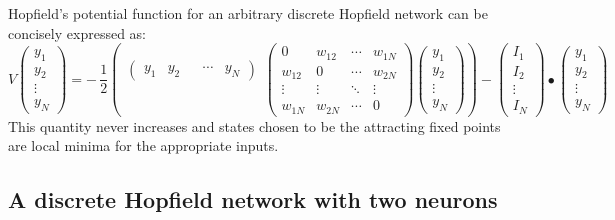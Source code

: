   Hopfield's potential function for an arbitrary discrete Hopfield network 
can be concisely expressed as:
\begin{equation}
V
\begin{pmatrix}
y_1 \\  y_2 \\ \vdots \\ y_N
\end{pmatrix}
  =  -\,\displaystyle{\frac{1}{2}} \left(
     \begin{matrix}
       \begin{pmatrix}
           y_1 & y_2 & & \cdots & y_N 
       \end{pmatrix} \\ \\ \\ \mbox{}\end{matrix}
       \begin{pmatrix} 
           0      & w_{12} & \cdots & w_{1N} \\ 
           w_{12} &   0    & \cdots & w_{2N} \\ 
           \vdots & \vdots & \ddots & \vdots \\ 
           w_{1N} & w_{2N} & \cdots &   0  
       \end{pmatrix} 
       \begin{pmatrix} 
            y_1 \\ y_2 \\ \vdots \\ y_N 
       \end{pmatrix} 
     \right) -
\begin{pmatrix}
I_1 \\  I_2 \\ \vdots \\ I_N
\end{pmatrix}
\bullet
\begin{pmatrix}
y_1 \\  y_2 \\ \vdots \\ y_N
\end{pmatrix}
\end{equation}
This quantity never increases and states chosen to be the attracting fixed 
points are local minima for the appropriate inputs.
  
\subsection{A discrete Hopfield network with two neurons}

